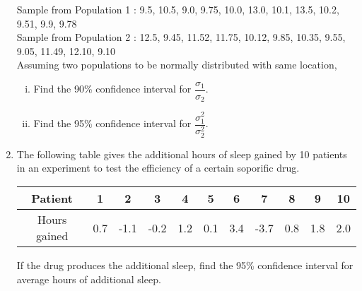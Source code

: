 \documentclass[11pt, a4paper]{article}
\begin{document}
\begin{enumerate}
Sample from Population 1 : 9.5, 10.5, 9.0, 9.75, 10.0, 13.0, 10.1, 13.5, 10.2, 9.51, 9.9, 9.78 \\

Sample from Population 2 : 12.5, 9.45, 11.52, 11.75, 10.12, 9.85, 10.35, 9.55, 9.05, 11.49, 12.10, 9.10 \\

Assuming two populations to be normally distributed with same location,
	\begin{enumerate}[(i)]
		\item Find the 90\% confidence interval for $\dfrac{\sigma_1}{\sigma_2}$.
		
		\item Find the 95\% confidence interval for $\dfrac{\sigma_1^2}{\sigma_2^2}$.
	
	\end{enumerate}
















\item The following table gives the additional hours of sleep gained by 10 patients in an experiment to test the efficiency of a certain soporific drug. \\


\begin{table}[h]
\def\arraystertch{1.5}

\begin{center}
\begin{tabular}{|c|cccccccccc|}

\hline

Patient & 1 & 2 & 3 & 4 & 5 & 6 & 7 & 8 & 9 & 10 \\

\hline

Hours gained & 0.7 & -1.1 & -0.2 & 1.2 & 0.1 & 3.4 & -3.7 & 0.8 & 1.8 & 2.0 \\

\hline

\end{tabular}
\end{center}

\end{table}

If the drug produces the additional sleep, find the 95\% confidence interval for average hours of additional sleep.



















\end{enumerate}
\end{document}
